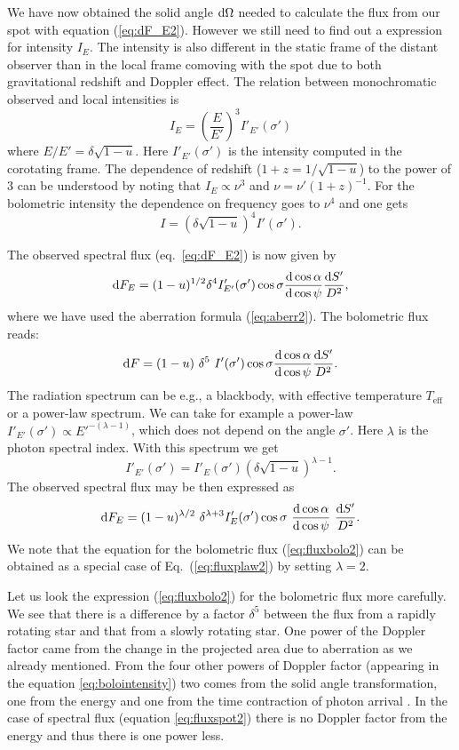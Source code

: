\documentclass{wihuri}
\def\be{\begin{equation}}
\def\ee{\end{equation}}
\def\d{{\rm d}}
\def\Dop{\delta}
\begin{document}
We have now obtained the solid angle $\d\Omega$ needed to calculate the flux from our spot with equation (\ref{eq:dF_E2}). However we still need to find out a expression for intensity $I_{E}$. The intensity is also different in the static frame of the distant observer than in the local frame comoving with the spot due to both gravitational redshift and Doppler effect. The relation between monochromatic observed and local intensities is \cite{mtw}\cite{rybicki}%
\be
I_{E} = \left (\frac{E}{E'}\right )^3 I'_{E '} (\sigma')
\ee
where $E/E'=\Dop \sqrt{1-u}$. Here $I'_{E'}(\sigma')$ is the intensity computed in the corotating frame. The dependence of redshift ($1+z = 1/\sqrt{1-u}$) to the power of 3 can be understood by noting that $I_{E} \propto \nu^{3}$ and $\nu = \nu'(1+z)^{-1}$.
For the bolometric intensity the dependence on frequency goes to $\nu^{4}$ and one gets
\be \label{eq:bolointensity}
I= \left (\Dop \sqrt{1-u} \right )^4 I'(\sigma') .
\ee

The observed spectral flux (eq.~\ref{eq:dF_E2}) is now given by
\be \label{eq:fluxspot2}
\d F_{E}=(1-u)^{1/2} \Dop^{4} I'_{E'}(\sigma') \cos\sigma
\frac{\d \cos\alpha}{\d\cos\psi}
 \frac{\d S'}{D^2} ,
\ee
where we have used the aberration formula (\ref{eq:aberr2}).
The bolometric flux reads:
\be  \label{eq:fluxbolo2}
\d F= (1-u)\ \Dop^5 \
I'(\sigma')  \cos\sigma \frac{\d\cos\alpha}{\d\cos\psi} \frac{\d S'}{D^2} .
\ee
The radiation spectrum can be e.g., a blackbody, with effective temperature $T_{\mathrm{eff}}$ or a power-law spectrum. We can take for example a power-law $I'_{E'}(\sigma') \propto E '^{-(\lambda-1)}$, which does not depend on the angle $\sigma'$. Here $\lambda$ is the photon spectral index. With this spectrum we get
\be \label{eq:int_trans2}
I'_{E'}(\sigma') = I'_{E}(\sigma')
\left( \Dop \sqrt{1-u} \right)^{\lambda-1} .
\ee
The observed spectral flux %
may be then expressed as
\be\label{eq:fluxplaw2}
\d F_{E}= (1-u)^{\lambda/2}\ \Dop^{\lambda+3} I'_E(\sigma')
\cos\sigma\ \frac{\d\cos\alpha}{\d\cos\psi}\ \frac{\d S'}{D^2}.
\ee
We note that the equation for the bolometric flux (\ref{eq:fluxbolo2})
can be obtained as a special case of Eq.~(\ref{eq:fluxplaw2}) by setting $\lambda=2$. 

Let us look the expression (\ref{eq:fluxbolo2}) for the bolometric flux more carefully. We see that there is a difference by a factor $\Dop^5$ between the flux from a rapidly rotating star and that from a slowly rotating star. One power of the Doppler factor came from the change in the projected area due to aberration as we already mentioned. From the four other powers of Doppler factor (appearing in the equation \ref{eq:bolointensity}) two comes from the solid angle transformation, one from the energy and one from the time contraction of photon arrival \cite{rybicki}. %
In the case of spectral flux (equation \ref{eq:fluxspot2}) there is no Doppler factor from the energy and thus there is one power less.
\end{document}
